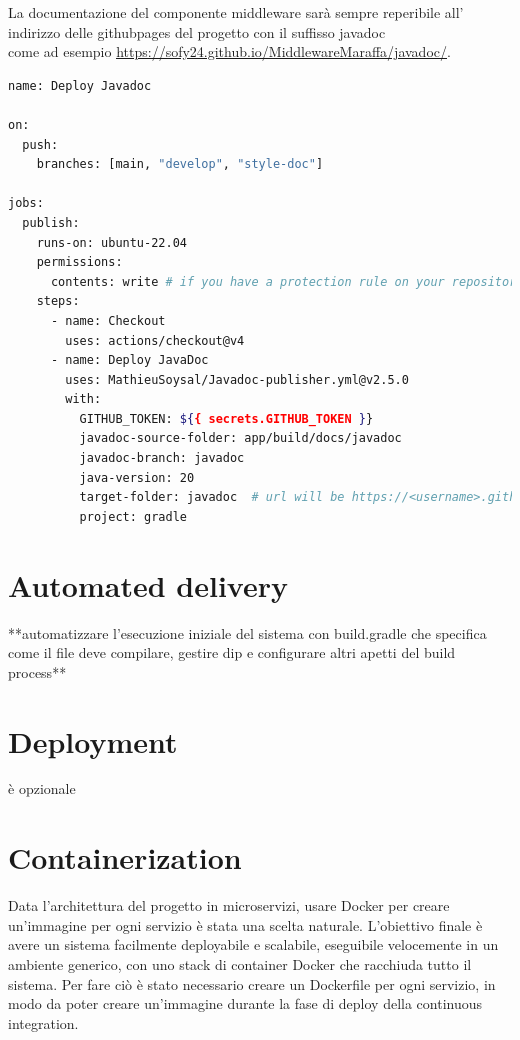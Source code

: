 La documentazione del componente middleware sarà sempre reperibile
all' indirizzo delle githubpages del progetto con il suffisso javadoc \\ come ad esempio \href{https://sofy24.github.io/MiddlewareMaraffa/javadoc/}{\underline{https://sofy24.github.io/MiddlewareMaraffa/javadoc/}}.

\begin{lstlisting}[language=Bash, caption={Configurazione della GitHub Action per il Javadoc}, label=list:javadoc_action]
name: Deploy Javadoc

on:
  push:
    branches: [main, "develop", "style-doc"]

jobs:
  publish:
    runs-on: ubuntu-22.04
    permissions:
      contents: write # if you have a protection rule on your repository, you'll need to give write permission to the workflow.
    steps:
      - name: Checkout
        uses: actions/checkout@v4
      - name: Deploy JavaDoc
        uses: MathieuSoysal/Javadoc-publisher.yml@v2.5.0
        with:
          GITHUB_TOKEN: ${{ secrets.GITHUB_TOKEN }}
          javadoc-source-folder: app/build/docs/javadoc
          javadoc-branch: javadoc
          java-version: 20
          target-folder: javadoc  # url will be https://<username>.github.io/<repo>/javadoc, This can be left as nothing to generate javadocs in the root folder.
          project: gradle
\end{lstlisting}


\section{Automated delivery}
**automatizzare l'esecuzione iniziale del sistema con build.gradle che specifica come
il file deve compilare, gestire dip e configurare altri apetti del build process**
\section{Deployment}
è opzionale
\section{Containerization}

Data l'architettura del progetto in microservizi, usare Docker per creare un'immagine per ogni servizio è stata una scelta naturale. 
L'obiettivo finale è avere un sistema facilmente deployabile e scalabile, eseguibile velocemente in un ambiente generico, con uno stack di container Docker che racchiuda tutto il sistema.
Per fare ciò è stato necessario creare un Dockerfile per ogni servizio, in modo da poter creare un'immagine durante la fase di deploy della continuous integration.
\vspace{1cm}

